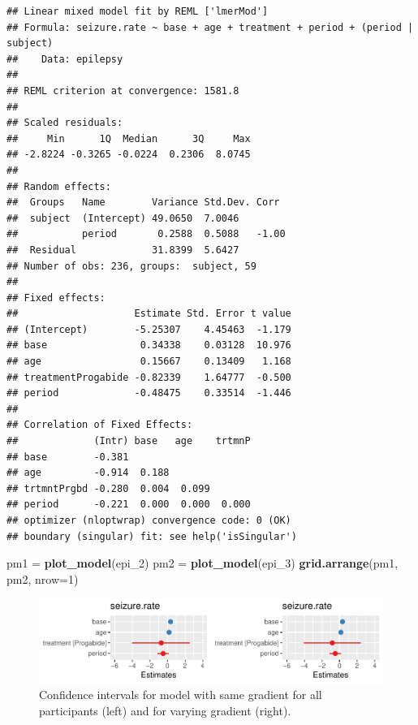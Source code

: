 \documentclass[
  openany]{book}
\newenvironment{Shaded}{\begin{snugshade}}{\end{snugshade}}
\newcommand{\AttributeTok}[1]{\textcolor[rgb]{0.13,0.29,0.53}{#1}}
\newcommand{\DecValTok}[1]{\textcolor[rgb]{0.00,0.00,0.81}{#1}}
\newcommand{\FunctionTok}[1]{\textcolor[rgb]{0.13,0.29,0.53}{\textbf{#1}}}
\newcommand{\NormalTok}[1]{#1}
\newcommand{\OtherTok}[1]{\textcolor[rgb]{0.56,0.35,0.01}{#1}}
\theoremstyle{definition}
\theoremstyle{definition}
\theoremstyle{definition}
\theoremstyle{definition}
\theoremstyle{remark}
\begin{document}
\begin{verbatim}
## Linear mixed model fit by REML ['lmerMod']
## Formula: seizure.rate ~ base + age + treatment + period + (period | subject)
##    Data: epilepsy
## 
## REML criterion at convergence: 1581.8
## 
## Scaled residuals: 
##     Min      1Q  Median      3Q     Max 
## -2.8224 -0.3265 -0.0224  0.2306  8.0745 
## 
## Random effects:
##  Groups   Name        Variance Std.Dev. Corr 
##  subject  (Intercept) 49.0650  7.0046        
##           period       0.2588  0.5088   -1.00
##  Residual             31.8399  5.6427        
## Number of obs: 236, groups:  subject, 59
## 
## Fixed effects:
##                    Estimate Std. Error t value
## (Intercept)        -5.25307    4.45463  -1.179
## base                0.34338    0.03128  10.976
## age                 0.15667    0.13409   1.168
## treatmentProgabide -0.82339    1.64777  -0.500
## period             -0.48475    0.33514  -1.446
## 
## Correlation of Fixed Effects:
##             (Intr) base   age    trtmnP
## base        -0.381                     
## age         -0.914  0.188              
## trtmntPrgbd -0.280  0.004  0.099       
## period      -0.221  0.000  0.000  0.000
## optimizer (nloptwrap) convergence code: 0 (OK)
## boundary (singular) fit: see help('isSingular')
\end{verbatim}

\begin{Shaded}
\begin{Highlighting}[]
\NormalTok{pm1 }\OtherTok{=} \FunctionTok{plot\_model}\NormalTok{(epi\_2)}
\NormalTok{pm2 }\OtherTok{=} \FunctionTok{plot\_model}\NormalTok{(epi\_3)}
\FunctionTok{grid.arrange}\NormalTok{(pm1, pm2, }\AttributeTok{nrow=}\DecValTok{1}\NormalTok{)}
\end{Highlighting}
\end{Shaded}

\begin{figure}
\centering
\includegraphics{CT4H_notes_files/figure-latex/unnamed-chunk-73-1.pdf}
\caption{\label{fig:unnamed-chunk-73}Confidence intervals for model with same gradient for all participants (left) and for varying gradient (right).}
\end{figure}
\end{document}
